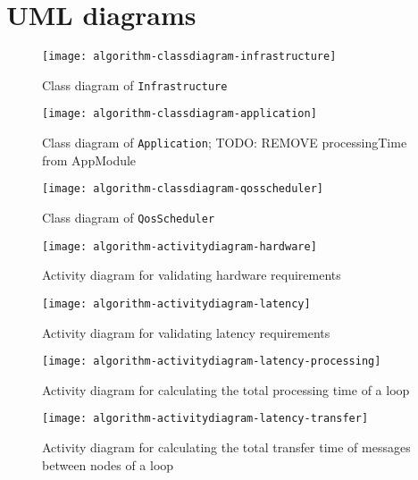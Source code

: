 \clearpage
\appendix

\chapter{UML diagrams\label{cha:algorithm-UML-diagrams}}

\begin{figure}[htb]
    \centering
    \texttt{[image: algorithm-classdiagram-infrastructure]}
    \caption{Class diagram of \texttt{Infrastructure}}
    \label{fig:classdiagram-infrastructure}
\end{figure}

\begin{figure}[htb]
    \centering
    \texttt{[image: algorithm-classdiagram-application]}
    \caption{Class diagram of \texttt{Application}; TODO: REMOVE processingTime from AppModule}
    \label{fig:classdiagram-application}
\end{figure}

\begin{figure}[htb]
    \centering
    \texttt{[image: algorithm-classdiagram-qosscheduler]}
    \caption{Class diagram of \texttt{QosScheduler}}
    \label{fig:classdiagram-qosscheduler}
\end{figure}

\begin{figure}[htb]
    \centering
    \texttt{[image: algorithm-activitydiagram-hardware]}
    \caption{Activity diagram for validating hardware requirements}
    \label{fig:algorithm-activitydiagram-hardware}
\end{figure}


\begin{figure}[htb]
    \centering
    \texttt{[image: algorithm-activitydiagram-latency]}
    \caption{Activity diagram for validating latency requirements}
    \label{fig:algorithm-activitydiagram-latency}
\end{figure}

\begin{figure}[htb]
    \centering
    \texttt{[image: algorithm-activitydiagram-latency-processing]}
    \caption{Activity diagram for calculating the total processing time of a loop}
    \label{fig:algorithm-activitydiagram-latency-processing}
\end{figure}

\begin{figure}[htb]
    \centering
    \texttt{[image: algorithm-activitydiagram-latency-transfer]}
    \caption{Activity diagram for calculating the total transfer time of messages between nodes of a loop}
    \label{fig:algorithm-activitydiagram-latency-transfer}
\end{figure}

